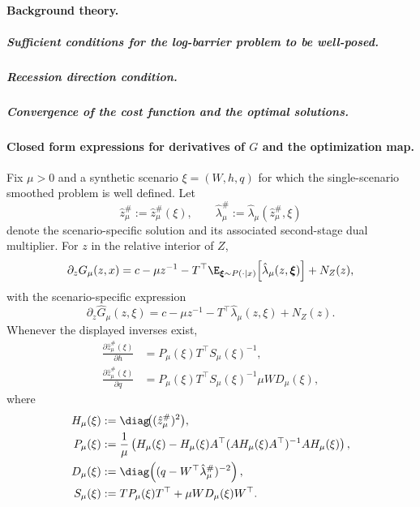 \paragraph{Background theory.}
\label{app:logbarrier-background}

\subparagraph{Sufficient conditions for the log-barrier problem to be well-posed.}
\label{app:logbarrier-well-posed}

\subparagraph{Recession direction condition.}
\label{app:recession-direction-condition}

\subparagraph{Convergence of the cost function and the optimal solutions.}
\label{app:logbarrier-convergence}

\paragraph{Closed form expressions for derivatives of $G$ and the optimization map.}
\label{app:closed-form-derivatives-extended}

Fix $\mu>0$ and a synthetic scenario $\xi=(W,h,q)$ for which the single-scenario smoothed problem is well defined. Let
\[
\hat z_\mu^\#:=\hat z_\mu^\#(\xi),
\qquad
\hat\lambda_\mu^\#:=\hat\lambda_\mu(\hat z_\mu^\#,\xi)
\]
denote the scenario-specific solution and its associated second-stage dual multiplier. For $z$ in the relative interior of $Z$,
\[
\partial_z G_\mu(z,x)
=
c-\mu z^{-1}
-T^\top\E_{\boldsymbol{\xi}\sim P(\cdot\mid x)}
\!\left[\hat\lambda_\mu(z,\boldsymbol{\xi})\right]
+N_Z(z),
\]
with the scenario-specific expression
\[
\partial_z \hat G_\mu(z,\xi)
=
c-\mu z^{-1}-T^\top\hat\lambda_\mu(z,\xi)+N_Z(z).
\]
Whenever the displayed inverses exist,
\[
\begin{aligned}
\frac{\partial \hat z_\mu^\#(\xi)}{\partial h}
&=
P_\mu(\xi)T^\top S_\mu(\xi)^{-1},
\\
\frac{\partial \hat z_\mu^\#(\xi)}{\partial q}
&=
P_\mu(\xi)T^\top S_\mu(\xi)^{-1}\mu W D_\mu(\xi),
\end{aligned}
\]
where
\[
\begin{aligned}
H_\mu(\xi)&:=\diag\!\big((\hat z_\mu^\#)^2\big),\\
P_\mu(\xi)&:=\frac1\mu\left(H_\mu(\xi)-H_\mu(\xi)A^\top(AH_\mu(\xi)A^\top)^{-1}AH_\mu(\xi)\right),\\
D_\mu(\xi)&:=\diag\!\left((q-W^\top\hat\lambda_\mu^\#)^{-2}\right),\\
S_\mu(\xi)&:=TP_\mu(\xi)T^\top+\mu W D_\mu(\xi)W^\top.
\end{aligned}
\]

